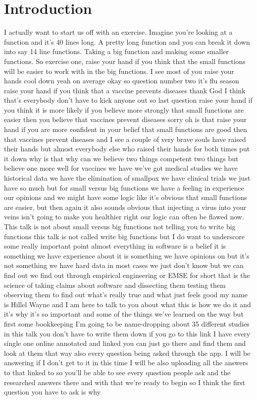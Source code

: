 \documentclass[conference, compsoc, twoside]{IEEEtran}
\begin{document}
\section{Introduction}
I actually want to start us off with an exercise. 
Imagine you're looking at a function and it's 40 lines long.
A pretty long function and you can break it down into say 14 line functions.
Taking a big function and making some smaller functions. 
So exercise one, raise your hand if you think that the small functions will be easier to work with in the big functions. 
I see most of you raise your hands cool down yeah on average okay so
question number two it's flu season raise your hand if you think that a
vaccine prevents diseases thank God I think that's everybody don't
have to kick anyone out so last question
raise your hand if you think it is more
likely if you believe more strongly that
small functions are easier then you
believe that vaccines prevent diseases
sorry oh is that raise your hand if you
are more confident in your belief that
small functions are good then that vaccines prevent diseases and I see a
couple of very brave souls have raised
their hands but almost everybody else
who raised their hands for both times
put it down why is that why can we
believe two things competent two things
but believe one more well for vaccines
we have we've got medical studies we
have historical data we have the
elimination of smallpox we have clinical
trials we just have so much but for small versus big functions we have a feeling in experience our opinions and we might have some logic like it's obvious that small functions are easier, but then again it also sounds obvious that injecting a virus into your veins isn't going to make you healthier right our logic can often be flawed now.
This talk is not about small versus big functions not telling you to write big functions this talk is not called write big
functions but I do want to underscore some really important point almost everything in software is a
belief it is something we have
experience about it is something we have
opinions on but it's not something we
have hard data in most cases we just
don't know but we can find out we find
out through empirical engineering or EMSE
for short that is the science of taking
claims about software and dissecting
them testing them observing them to find
out what's really true and what just
feels good my name is Hillel Wayne and I
am here to talk to you about what this
is how we do it and it's why it's so
important and some of the things we've
learned on the way but first some
bookkeeping I'm going to be
name-dropping about 35 different studies in this talk you don't have to write them down if you go to this link I have
every single one online annotated and linked you can just go there and find
them and look at them that way also every question being asked through the app.
I will be answering if I don't get to it in this time I will be also
uploading all the answers to that linked
to so you'll be able to see every
question people ask and the researched
answers there and with that we're ready
to begin so I think the first question
you have to ask is why 
\end{document}

